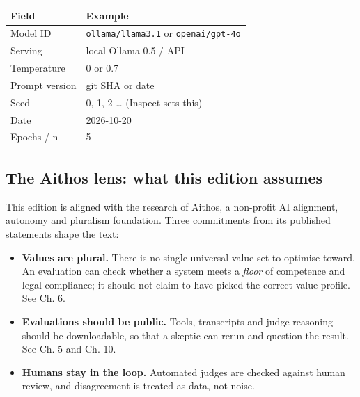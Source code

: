\begin{center}
\begin{tabular}{ll}
\toprule
Field & Example \\
\midrule
Model ID & \texttt{ollama/llama3.1} or \texttt{openai/gpt-4o} \\
Serving & local Ollama 0.5 / API \\
Temperature & 0 or 0.7 \\
Prompt version & git SHA or date \\
Seed & 0, 1, 2 … (Inspect sets this) \\
Date & 2026-10-20 \\
Epochs / n & 5 \\
\bottomrule
\end{tabular}
\end{center}

\subsection*{The Aithos lens: what this edition assumes}
This edition is aligned with the research of Aithos, a non-profit AI alignment, autonomy and pluralism foundation. Three commitments from its published statements shape the text:
\begin{itemize}
\item \textbf{Values are plural.} There is no single universal value set to optimise toward. An evaluation can check whether a system meets a \emph{floor} of competence and legal compliance; it should not claim to have picked the correct value profile. See Ch. 6.
\item \textbf{Evaluations should be public.} Tools, transcripts and judge reasoning should be downloadable, so that a skeptic can rerun and question the result. See Ch. 5 and Ch. 10.
\item \textbf{Humans stay in the loop.} Automated judges are checked against human review, and disagreement is treated as data, not noise.
\end{itemize}

